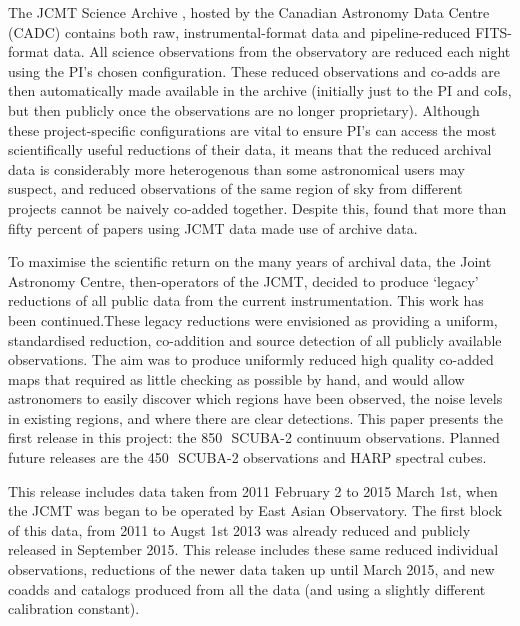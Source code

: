 \documentclass[twocolumn]{aastex6}
\newcommand{\um}{\micron}
\begin{document}
The JCMT Science Archive \citep{2015Economou}, hosted by the Canadian
Astronomy Data Centre (CADC) contains both raw, instrumental-format
data and pipeline-reduced FITS-format data. All science observations
from the observatory are reduced each night using the PI's chosen
configuration.  These reduced observations and co-adds are then
automatically made available in the archive (initially just to the PI
and coIs, but then publicly once the observations are no longer
proprietary). Although these project-specific configurations are vital
to ensure PI's can access the most scientifically useful reductions of
their data, it means that the reduced archival data is considerably
more heterogenous than some astronomical users may suspect, and
reduced observations of the same region of sky from different projects
cannot be naively co-added together. Despite this, \citet{Bell2014}
found that more than fifty percent of papers using JCMT data made use
of archive data.

To maximise the scientific return on the many years of archival data,
the Joint Astronomy Centre, then-operators of the JCMT, decided to
produce `legacy' reductions of all public data from the current
instrumentation. This work has been continued.These legacy reductions
were envisioned as providing a uniform, standardised reduction,
co-addition and source detection of all publicly available
observations. The aim was to produce uniformly reduced high quality
co-added maps that required as little checking as possible by hand,
and would allow astronomers to easily discover which regions have been
observed, the noise levels in existing regions, and where there are
clear detections. This paper presents the first release in this
project: the 850\,\um\ SCUBA-2 continuum observations. Planned future
releases are the 450\,\um\ SCUBA-2 observations and HARP spectral
cubes.


This release includes data taken from 2011 February 2 to 2015 March
1st, when the JCMT was began to be operated by East Asian Observatory.
The first block of this data, from 2011 to Augst 1st 2013 was already
reduced and publicly released in September 2015. This release includes
these same reduced individual observations, reductions of the newer
data taken up until March 2015, and new coadds and catalogs produced
from all the data (and using a slightly different calibration
constant).
\end{document}
